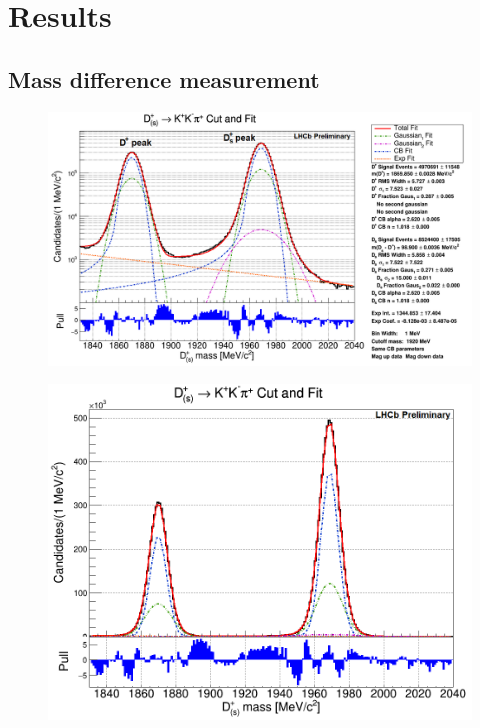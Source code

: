 \documentclass{beamer}%
\newif\ifplacelogo %
\begin{document}
\section{Results}

\subsection{Mass difference measurement}

\placelogofalse
\begin{frame}
\begin{figure}
\includegraphics[width=1.00\linewidth]{bigfit.png}
\end{figure}
\end{frame}


\begin{frame}
\begin{figure}
\includegraphics[width=0.8\linewidth]{linfitonly.png}
\end{figure}
\end{frame}
\end{document}
